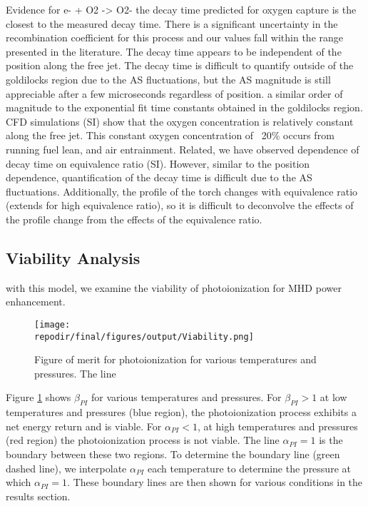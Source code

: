 \begin{outline}
    
\1 Evidence for e- + O2 -> O2-
    \2 the decay time predicted for oxygen capture is the closest to the measured decay time. There is a significant uncertainty in the recombination coefficient for this process and our values fall within the range presented in the literature. 
    \2 The decay time appears to be independent of the position along the free jet. The decay time is difficult to quantify outside of the goldilocks region due to the AS fluctuations, but the AS magnitude is still appreciable after a few microseconds regardless of position. a similar order of magnitude to the exponential fit time constants obtained in the goldilocks region. CFD simulations (SI) show that the oxygen concentration is relatively constant along the free jet. This constant oxygen concentration of ~20\% occurs from running fuel lean, and air entrainment. 
    \2 Related, we have observed dependence of decay time on equivalence ratio (SI). However, similar to the position dependence, quantification of the decay time is difficult due to the AS fluctuations. Additionally, the profile of the torch changes with equivalence ratio (extends for high equivalence ratio), so it is difficult to deconvolve the effects of the profile change from the effects of the equivalence ratio.
\end{outline}



\subsection{Viability Analysis}

with this model, we examine the viability of photoionization for MHD power enhancement. 


\begin{figure}[h]
    \centering
    \texttt{[image: \\repodir/final/figures/output/Viability.png]} 
    \caption{Figure of merit for photoionization for various temperatures and pressures. The line}   
    \label{fig:viability_alpha}
\end{figure}

Figure \ref{fig:viability_alpha} shows $\beta_{PI}$ for various temperatures and pressures.  For $\beta_{PI} > 1$ at low temperatures and pressures (blue region), the photoionization process exhibits a net energy return and is viable. For $\alpha_{PI} < 1$, at high temperatures and pressures (red region) the photoionization process is not viable. The line $\alpha_{PI} = 1$ is the boundary between these two regions. To determine the boundary line (green dashed  line), we interpolate $\alpha_{PI}$ each temperature to determine the pressure at which $\alpha_{PI} = 1$. These boundary lines are then shown for various conditions in the results section.

